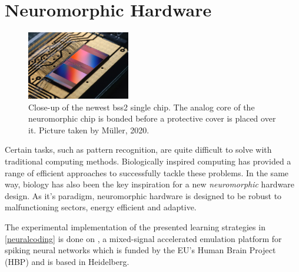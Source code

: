 %





\section{Neuromorphic Hardware}

\begin{figure}
	\centering
	\includegraphics[width=0.4\textwidth]{figures/HXcloseup.JPG}
	\caption[Close-up of the newest \gls{bss2} single chip.]{Close-up of the newest \gls{bss2} single chip. The analog core of the neuromorphic chip is bonded before a protective cover is placed over it. Picture taken by M{\"u}ller, 2020.} 
	\label{hxcloseup}
\end{figure}

Certain tasks, such as pattern recognition, are quite difficult to solve with traditional computing methods.  Biologically inspired computing has provided a range of efficient approaches to successfully tackle these problems. In the same way, biology has also been the key inspiration for a new \emph{neuromorphic} hardware design. As it's paradigm, neuromorphic hardware is designed to be robust to malfunctioning sectors, energy efficient and adaptive. 

The experimental implementation of the presented learning strategies in \cref{neuralcoding} is done on , a mixed-signal accelerated emulation platform for spiking neural networks which is funded by the EU's Human Brain Project (HBP) and is based in Heidelberg.

